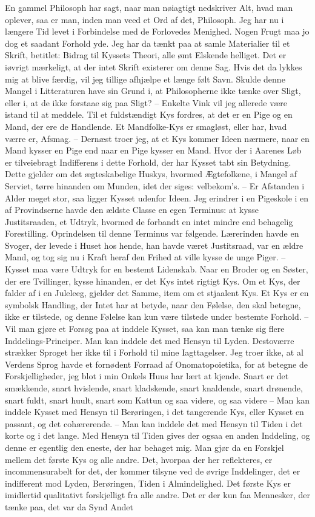 \documentclass[12pt,a4paper]{article}
\begin{document}
En gammel Philosoph har sagt, naar man nøiagtigt nedskriver Alt, hvad man oplever, saa er man, inden man veed et Ord af det, Philosoph. Jeg har nu i længere Tid levet i Forbindelse med de Forlovedes Menighed. Nogen Frugt maa jo dog et saadant Forhold yde. Jeg har da tænkt paa at samle Materialier til et Skrift, betitlet: Bidrag til Kyssets Theori, alle ømt Elskende helliget. Det er iøvrigt mærkeligt, at der intet Skrift existerer om denne Sag. Hvis det da lykkes mig at blive færdig, vil jeg tillige afhjælpe et længe følt Savn. Skulde denne Mangel i Litteraturen have sin Grund i, at Philosopherne ikke tænke over Sligt, eller i, at de ikke forstaae sig paa Sligt? – Enkelte Vink vil jeg allerede være istand til at meddele. Til et fuldstændigt Kys fordres, at det er en Pige og en Mand, der ere de Handlende. Et Mandfolke-Kys er smagløst, eller har, hvad værre er, Afsmag. – Dernæst troer jeg, at et Kys kommer Ideen nærmere, naar en Mand kysser en Pige end naar en Pige kysser en Mand. Hvor der i Aarenes Løb er tilveiebragt Indifferens i dette Forhold, der har Kysset tabt sin Betydning. Dette gjelder om det ægteskabelige Huskys, hvormed Ægtefolkene, i Mangel af Serviet, tørre hinanden om Munden, idet der siges: velbekom's. – Er Afstanden i Alder meget stor, saa ligger Kysset udenfor Ideen. Jeg erindrer i en Pigeskole i en af Provindserne havde den ældste Classe en egen Terminus: at kysse Justitsraaden, et Udtryk, hvormed de forbandt en intet mindre end behagelig Forestilling. Oprindelsen til denne Terminus var følgende. Lærerinden havde en Svoger, der levede i Huset hos hende, han havde været Justitsraad, var en ældre Mand, og tog sig nu i Kraft heraf den Frihed at ville kysse de unge Piger. – Kysset maa være Udtryk for en bestemt Lidenskab. Naar en Broder og en Søster, der ere Tvillinger, kysse hinanden, er det Kys intet rigtigt Kys. Om et Kys, der falder af i en Juleleeg, gjelder det Samme, item om et stjaalent Kys. Et Kys er en symbolsk Handling, der Intet har at betyde, naar den Følelse, den skal betegne, ikke er tilstede, og denne Følelse kan kun være tilstede under bestemte Forhold. – Vil man gjøre et Forsøg paa at inddele Kysset, saa kan man tænke sig flere Inddelings-Principer. Man kan inddele det med Hensyn til Lyden. Destoværre strækker Sproget her ikke til i Forhold til mine Iagttagelser. Jeg troer ikke, at al Verdens Sprog havde et fornødent Forraad af Onomatopoietika, for at betegne de Forskjelligheder, jeg blot i min Onkels Huus har lært at kjende. Snart er det smækkende, snart hvislende, snart kladskende, snart knaldende, snart drønende, snart fuldt, snart huult, snart som Kattun og saa videre, og saa videre – Man kan inddele Kysset med Hensyn til Berøringen, i det tangerende Kys, eller Kysset en passant, og det cohærerende. – Man kan inddele det med Hensyn til Tiden i det korte og i det lange. Med Hensyn til Tiden gives der ogsaa en anden Inddeling, og denne er egentlig den eneste, der har behaget mig. Man gjør da en Forskjel mellem det første Kys og alle andre. Det, hvorpaa der her reflekteres, er incommensurabelt for det, der kommer tilsyne ved de øvrige Inddelinger, det er indifferent mod Lyden, Berøringen, Tiden i Almindelighed. Det første Kys er imidlertid qualitativt forskjelligt fra alle andre. Det er der kun faa Mennesker, der tænke paa, det var da Synd Andet 
\end{document}

